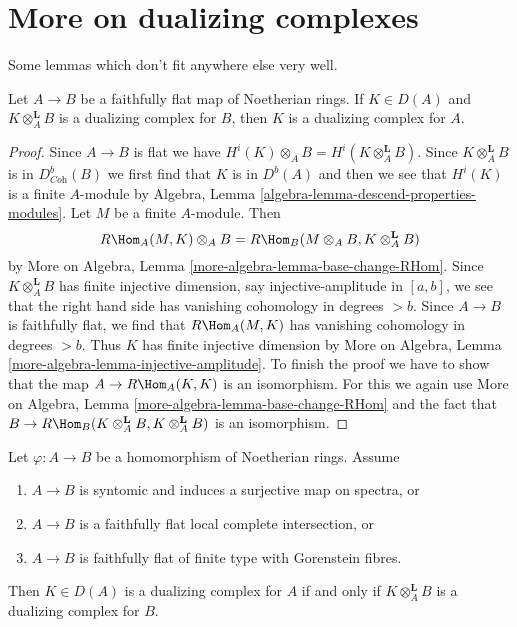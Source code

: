 \section{More on dualizing complexes}
\label{section-more-dualizing}

\noindent
Some lemmas which don't fit anywhere else very well.

\begin{lemma}
\label{lemma-descent}
Let $A \to B$ be a faithfully flat map of Noetherian rings.
If $K \in D(A)$ and $K \otimes_A^\mathbf{L} B$
is a dualizing complex for $B$, then $K$ is a dualizing complex
for $A$.
\end{lemma}

\begin{proof}
Since $A \to B$ is flat we have
$H^i(K) \otimes_A B = H^i(K \otimes_A^\mathbf{L} B)$.
Since $K \otimes_A^\mathbf{L} B$ is in $D^b_{\textit{Coh}}(B)$
we first find that $K$ is in $D^b(A)$ and then we see that
$H^i(K)$ is a finite $A$-module by
Algebra, Lemma \ref{algebra-lemma-descend-properties-modules}.
Let $M$ be a finite $A$-module. Then
$$
R\Hom_A(M, K) \otimes_A B = R\Hom_B(M \otimes_A B, K \otimes_A^\mathbf{L} B)
$$
by More on Algebra, Lemma \ref{more-algebra-lemma-base-change-RHom}.
Since $K \otimes_A^\mathbf{L} B$ has finite injective dimension,
say injective-amplitude in $[a, b]$, we see that the right hand side
has vanishing cohomology in degrees $> b$.
Since $A \to B$ is faithfully flat, we find
that $R\Hom_A(M, K)$ has vanishing cohomology in degrees $> b$.
Thus $K$ has finite injective dimension by
More on Algebra, Lemma \ref{more-algebra-lemma-injective-amplitude}.
To finish the proof we have to show that the map
$A \to R\Hom_A(K, K)$ is an isomorphism.
For this we again use
More on Algebra, Lemma \ref{more-algebra-lemma-base-change-RHom}
and the fact that
$B \to R\Hom_B(K \otimes_A^\mathbf{L} B, K \otimes_A^\mathbf{L} B)$
is an isomorphism.
\end{proof}

\begin{lemma}
\label{lemma-descent-ascent}
Let $\varphi : A \to B$ be a homomorphism of Noetherian rings. Assume
\begin{enumerate}
\item $A \to B$ is syntomic and induces a surjective map on spectra, or
\item $A \to B$ is a faithfully flat local complete intersection, or
\item $A \to B$ is faithfully flat of finite type with Gorenstein fibres.
\end{enumerate}
Then $K \in D(A)$ is a dualizing complex for $A$ if and only if
$K \otimes_A^\mathbf{L} B$ is a dualizing complex for $B$.
\end{lemma}

